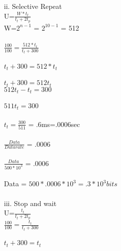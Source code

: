 \documentclass[a4paper,12pt]{article}
\begin{document}
ii. Selective Repeat\\
U=$\frac{W*t_{t}}{t_{t}+2t_{p}}$\\
W=$2^{n-1}$ = $2^{10-1}$ = 512\\\\
$\frac{100}{100} = \frac{512 * t_{t}}{t_{t}+300}$\\\\
$t_{t}+300=512* t_{t}$\\\\
$t_{t} + 300 = 512t_{t}$\\
$512t_{t}-t_{t} = 300$\\\\
$511t_{t}=300$\\\\
$t_{t} = \frac{300}{511}$ = .6ms=.0006sec\\\\
$\frac{Data}{Datarate}$ = .0006\\\\
$\frac{Data}{500*10^3}$ = .0006\\\\
Data = $500*.0006*10^3= .3 * 10^3 bits$\\\\

iii. Stop and wait\\
U=$\frac{t_{t}}{t_{t}+2t_{p}}$\\
$\frac{100}{100} = \frac{t_{t}}{t_{t}+300}$\\\\
$t_{t}+300=t_{t}$\\\\
\end{document}
